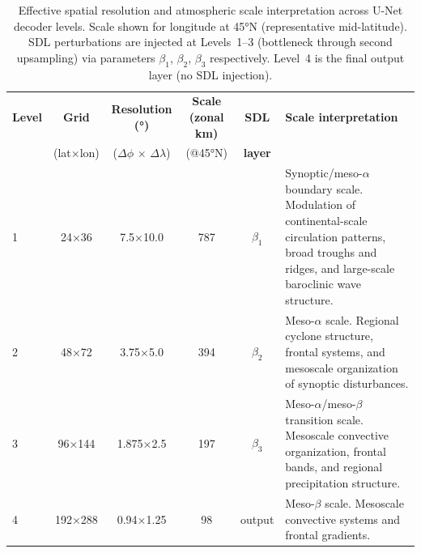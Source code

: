 \documentclass[11pt]{article}
\begin{document}
\begin{table}[h!]
\centering
\small
\begin{tabular}{lccccp{5.0cm}}
\toprule
\textbf{Level} & \textbf{Grid} & \textbf{Resolution (°)} & \textbf{Scale (zonal km)} & \textbf{SDL} & \textbf{Scale interpretation} \\
 & (lat×lon) & ($\Delta\phi$ × $\Delta\lambda$) & (@45°N) & \textbf{layer} & \\
\midrule
1 & 24×36   & 7.5×10.0  & 787 &
$\beta_1$ &
Synoptic/meso-$\alpha$ boundary scale. Modulation of continental-scale circulation patterns, broad troughs and ridges, and large-scale baroclinic wave structure. \\
2 & 48×72   & 3.75×5.0  & 394 &
$\beta_2$ &
Meso-$\alpha$ scale. Regional cyclone structure, frontal systems, and mesoscale organization of synoptic disturbances. \\
3 & 96×144  & 1.875×2.5 & 197 &
$\beta_3$ &
Meso-$\alpha$/meso-$\beta$ transition scale. Mesoscale convective organization, frontal bands, and regional precipitation structure. \\
4 & 192×288 & 0.94×1.25 & 98  &
output &
Meso-$\beta$ scale. Mesoscale convective systems and frontal gradients. \\
\bottomrule
\end{tabular}
\caption{Effective spatial resolution and atmospheric scale interpretation across U-Net decoder levels. Scale shown for longitude at 45°N (representative mid-latitude). SDL perturbations are injected at Levels~1--3 (bottleneck through second upsampling) via parameters $\beta_1$, $\beta_2$, $\beta_3$ respectively. Level~4 is the final output layer (no SDL injection).}
\label{tab:decoder_scales}
\end{table}
\end{document}
